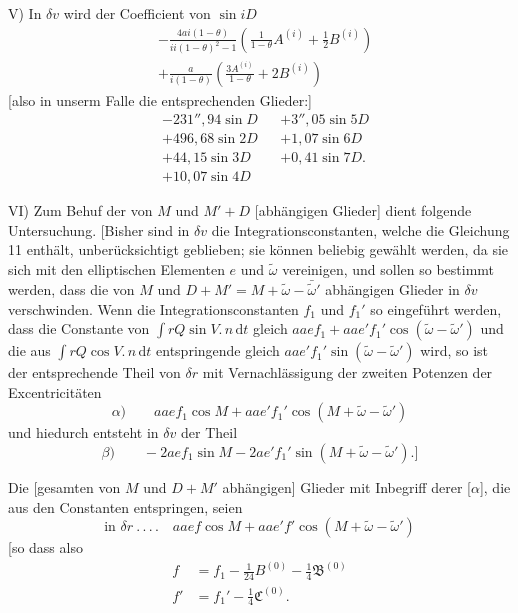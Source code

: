 V) In \(\delta v\) wird der Coefficient von \(\sin iD\)
\[
\begin{aligned}
&-\frac{4ai(1-\theta)}{ii(1-\theta)^2-1}\left(\frac1{1-\theta}A^{(i)}+\tfrac12B^{(i)}\right)\\
&+\frac a{i(1-\theta)}\left(\frac{3A^{(i)}}{1-\theta}+2B^{(i)}\right)
\end{aligned}
\]
[also in unserm Falle die entsprechenden Glieder:]
\[
\begin{aligned}
&-231''{,}94\sin D&&+3''{,}05\sin5D\\
&+496{,}68\sin2D&&+1{,}07\sin6D\\
&+44{,}15\sin3D&&+0{,}41\sin7D.\\
&+10{,}07\sin4D
\end{aligned}
\]

VI) Zum Behuf der von \(M\) und \(M'+D\) [abhängigen Glieder] dient folgende Untersuchung. [Bisher sind in \(\delta v\) die Integrationsconstanten, welche die Gleichung 11 enthält, unberücksichtigt geblieben; sie können beliebig gewählt werden, da sie sich mit den elliptischen Elementen \(e\) und \(\tilde\omega\) vereinigen, und sollen so bestimmt werden, dass die von \(M\) und \(D+M'=M+\tilde\omega-\bar{\tilde\omega}'\) abhängigen Glieder in \(\delta v\) verschwinden. Wenn die Integrationsconstanten \(f_1\) und \(f_1'\) so eingeführt werden, dass die Constante von \(\int rQ\sin V\mathord{.}\,n\,\mathrm{d}t\) gleich \(aaef_1+aae'f_1'\cos(\tilde\omega-\tilde\omega')\) und die aus \(\int rQ\cos V\mathord{.}\,n\,\mathrm{d}t\) entspringende gleich \(aae'f_1'\sin(\tilde\omega-\tilde\omega')\) wird, so ist der entsprechende Theil von \(\delta r\) mit Vernachlässigung der zweiten Potenzen der Excentricitäten
\[
\alpha)\qquad aaef_1\cos M+aae'f_1'\cos(M+\tilde\omega-\tilde\omega')
\]
und hiedurch entsteht in \(\delta v\) der Theil
\[
\beta)\qquad-2aef_1\sin M-2ae'f_1'\sin(M+\tilde\omega-\tilde\omega').]
\]

Die [gesamten von \(M\) und \(D+M'\) abhängigen] Glieder mit Inbegriff derer [\(\alpha\)], die aus den Constanten entspringen, seien
\hypertarget{native-399}{}
\[
\text{in }\delta r\ .\, .\, .\, .\quad aaef\cos M+aae'f'\cos(M+\tilde\omega-\tilde\omega')
\]
[so dass also
\[
\begin{aligned}
f&=f_1-\tfrac1{24}B^{(0)}-\tfrac14\mathfrak B^{(0)}\\
f'&=f_1'-\tfrac14\mathfrak C^{(0)}.
\end{aligned}
\]

